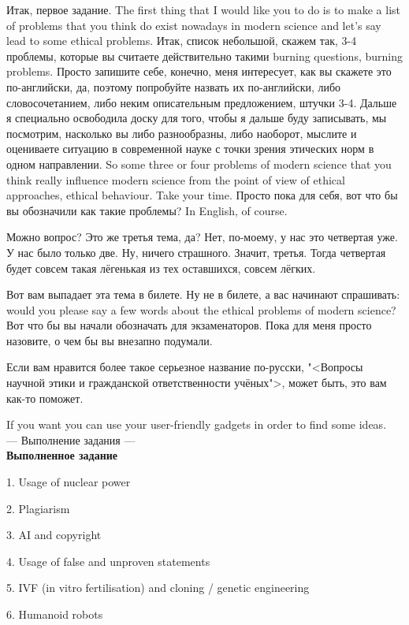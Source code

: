\documentclass[main.tex]{subfiles}
\begin{document}
Итак, первое задание.
The first thing that I would like you to do is to make a list of problems that you think do exist nowadays in modern science and let's say lead to some ethical problems.
Итак, список небольшой, скажем так, 3-4 проблемы, которые вы считаете действительно такими burning questions, burning problems.
Просто запишите себе, конечно, меня интересует, как вы скажете это по-английски, да, поэтому попробуйте назвать их по-английски, либо словосочетанием, либо неким описательным предложением, штучки 3-4.
Дальше я специально освободила доску для того, чтобы я дальше буду записывать, мы посмотрим, насколько вы либо разнообразны, либо наоборот, мыслите и оцениваете ситуацию в современной науке с точки зрения этических норм в одном направлении.
So some three or four problems of modern science that you think really influence modern science from the point of view of ethical approaches, ethical behaviour.
Take your time.
Просто пока для себя, вот что бы вы обозначили как такие проблемы?
In English, of course.

Можно вопрос? Это же третья тема, да? Нет, по-моему, у нас это четвертая уже.
У нас было только две.
Ну, ничего страшного.
Значит, третья.
Тогда четвертая будет совсем такая лёгенькая из тех оставшихся, совсем лёгких.

Вот вам выпадает эта тема в билете.
Ну не в билете, а вас начинают спрашивать: would you please say a few words about the ethical problems of modern science?
Вот что бы вы начали обозначать для экзаменаторов.
Пока для меня просто назовите, о чем бы вы внезапно подумали.

Если вам нравится более такое серьезное название по-русски, "<Вопросы научной этики и гражданской ответственности учёных">, может быть, это вам как-то поможет.

If you want you can use your user-friendly gadgets in order to find some ideas.
\\

--- Выполнение задания ---
\\

\textbf{Выполненное задание}

1. Usage of nuclear power

2. Plagiarism

3. AI and copyright

4. Usage of false and unproven statements

5. IVF (in vitro fertilisation) and cloning / genetic engineering

6. Humanoid robots
\end{document}
